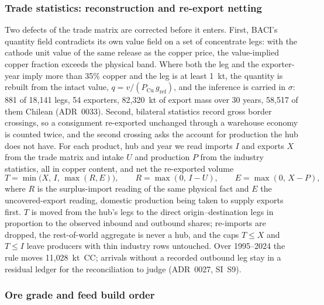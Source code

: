 \subsubsection{Trade statistics: reconstruction and re-export netting}\label{sec:baci}

Two defects of the trade matrix are corrected before it enters. First,
BACI's quantity field contradicts its own value field on a set of
concentrate legs: with the cathode unit value of the same release as the
copper price, the value-implied copper fraction exceeds the physical band.
Where both the leg and the exporter-year imply more than 35\% copper and the
leg is at least 1~kt, the quantity is rebuilt from the intact value, $q =
v/(P_{\mathrm{Cu}}\, g_{\mathrm{ref}})$, and the inference is carried in
$\sigma$: 881 of 18{,}141 legs, 54 exporters, 82{,}320~kt of export mass over
30 years, 58{,}517 of them Chilean (ADR~0033). Second, bilateral statistics
record gross border crossings, so a consignment re-exported unchanged
through a warehouse economy is counted twice, and the second crossing asks
the account for production the hub does not have. For each product, hub and
year we read imports $I$ and exports $X$ from the trade matrix and intake $U$
and production $P$ from the industry statistics, all in copper content, and
net the re-exported volume
\begin{equation}
T = \min\bigl(X,\, I,\, \max(R, E)\bigr), \qquad
R = \max(0,\, I-U), \qquad
E = \max(0,\, X-P),
\label{eq:reexport}
\end{equation}
where $R$ is the surplus-import reading of the same physical fact and $E$
the uncovered-export reading, domestic production being taken to supply
exports first. $T$ is moved from the hub's legs to the direct
origin--destination legs in proportion to the observed inbound and outbound
shares; re-imports are dropped, the rest-of-world aggregate is never a hub,
and the caps $T \le X$ and $T \le I$ leave producers with thin industry rows
untouched. Over 1995--2024 the rule moves 11{,}028~kt~CC; arrivals without
a recorded outbound leg stay in a residual ledger for the reconciliation to
judge (ADR~0027, SI~S9).

\subsubsection{Ore grade and feed build order}\label{sec:grade}

